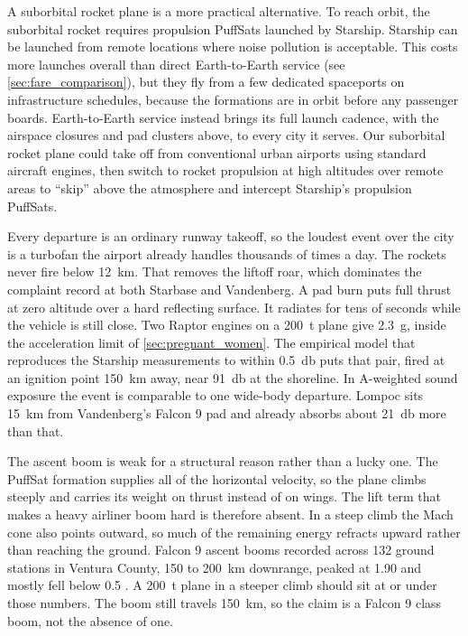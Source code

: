 \documentclass{article}
\begin{document}
\begin{itemize}
\end{itemize}



A suborbital rocket plane is a more practical alternative. To reach orbit, the suborbital rocket requires propulsion PuffSats launched by Starship.   Starship can be launched from remote locations where noise pollution is acceptable.  This costs more launches overall than direct Earth-to-Earth service (see \autoref{sec:fare_comparison}), but they fly from a few dedicated spaceports on infrastructure schedules, because the formations are in orbit before any passenger boards. Earth-to-Earth service instead brings its full launch cadence, with the airspace closures and pad clusters above, to every city it serves.  Our suborbital rocket plane could take off from conventional urban airports using standard aircraft engines, then switch to rocket propulsion at high altitudes over remote areas to ``skip'' above the atmosphere and intercept Starship's propulsion PuffSats.

Every departure is an ordinary runway takeoff, so the loudest event over the city is a turbofan the airport already handles thousands of times a day. The rockets never fire below \SI{12}{\kilo\meter}. That removes the liftoff roar, which dominates the complaint record at both Starbase and Vandenberg. A pad burn puts full thrust at zero altitude over a hard reflecting surface. It radiates for tens of seconds while the vehicle is still close. Two Raptor engines on a \SI{200}{\tonne} plane give \SI{2.3}{g}, inside the acceleration limit of \autoref{sec:pregnant_women}. The empirical model that reproduces the Starship measurements to within \SI{0.5}{\decibel} \cite{gee2025starship_acoustics} puts that pair, fired at an ignition point \SI{150}{\kilo\meter} away, near \SI{91}{\decibel} at the shoreline. In A-weighted sound exposure the event is comparable to one wide-body departure. Lompoc sits \SI{15}{\kilo\meter} from Vandenberg's Falcon 9 pad and already absorbs about \SI{21}{\decibel} more than that.

The ascent boom is weak for a structural reason rather than a lucky one. The PuffSat formation supplies all of the horizontal velocity, so the plane climbs steeply and carries its weight on thrust instead of on wings. The lift term that makes a heavy airliner boom hard is therefore absent. In a steep climb the Mach cone also points outward, so much of the remaining energy refracts upward rather than reaching the ground. Falcon 9 ascent booms recorded across 132 ground stations in Ventura County, 150 to \SI{200}{\kilo\meter} downrange, peaked at \SI{1.90}{\psf} and mostly fell below \SI{0.5}{\psf} \cite{gee2026falcon9boom}. A \SI{200}{\tonne} plane in a steeper climb should sit at or under those numbers. The boom still travels \SI{150}{\kilo\meter}, so the claim is a Falcon 9 class boom, not the absence of one.
\end{document}
